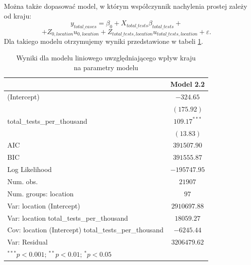 \documentclass[12pt]{mwbk}
\theoremstyle{plain}
\theoremstyle{definition}
\theoremstyle{definition}
\begin{document}
\noindent Można także dopasować model, w którym współczynnik nachylenia prostej zależy od kraju:
$$y_{total\_ cases}=\beta_0 + X_{total\_tests}\beta_{total\_ tests}+$$
$$+Z_{0,location}u_{0,location}+Z_{total\_tests, location}u_{total\_tests, location}+\varepsilon.$$
Dla takiego modelu otrzymujemy wyniki przedstawione w tabeli \ref{table:mod2-1}.
\newpage
\begin{table}[!h]
\begin{center}
	\begin{tabular}{l c}
		\hline
		& Model 2.2 \\
		\hline
		(Intercept)                                           & $-324.65$      \\
		& $(175.92)$     \\
		total\_tests\_per\_thousand                           & $109.17^{***}$ \\
		& $(13.83)$      \\
		\hline
		AIC                                                   & $391507.90$    \\
		BIC                                                   & $391555.87$    \\
		Log Likelihood                                        & $-195747.95$   \\
		Num. obs.                                             & $21907$        \\
		Num. groups: location                                 & $97$           \\
		Var: location (Intercept)                             & $2910697.88$   \\
		Var: location total\_tests\_per\_thousand             & $18059.27$     \\
		Cov: location (Intercept) total\_tests\_per\_thousand & $-6245.44$     \\
		Var: Residual                                         & $3206479.62$   \\
		\hline
		\multicolumn{2}{l}{\scriptsize{$^{***}p<0.001$; $^{**}p<0.01$; $^{*}p<0.05$}}
	\end{tabular}
	\caption{Wyniki dla modelu liniowego uwzględniającego wpływ kraju \\na parametry modelu}
	\label{table:mod2-1}
\end{center}
\end{table}
\end{document}
